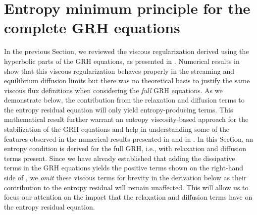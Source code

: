 \documentclass[times,doublespace]{fldauth}%
\begin{document}
\section{Entropy minimum principle for the complete GRH equations}
\label{sec:VR_new}
%
In the previous Section, we  reviewed the viscous regularization derived using the hyperbolic parts of the GRH equations, as presented in \cite{our_jcp_radhy_paper}. 
Numerical results in \cite{our_jcp_radhy_paper} show that this viscous regularization 
behaves properly in the streaming and equilibrium diffusion limits but there was no theoretical basis to justify the same viscous flux definitions when considering the \emph{full} GRH equations. As we 
demonstrate below, the contribution from the relaxation and diffusion terms to the entropy residual equation will only 
yield entropy-producing terms.
This mathematical result further warrant an entropy viscosity-based approach for the stabilization of the GRH equations 
and help in understanding  some of the features observed in the numerical results presented in  and in \cite{our_jcp_radhy_paper}.
%
%
In this Section, an entropy condition is derived for the full GRH, i.e., with relaxation and diffusion terms present.
Since we have already established that adding the dissipative terms in the GRH equations yields the positive terms shown on the right-hand side of 
, we \emph{omit} these viscous terms for brevity in the derivation below as their contribution to the entropy residual 
will remain unaffected. This will allow us to focus our attention on the impact that the relaxation and diffusion terms have on the entropy residual equation.
\end{document}
